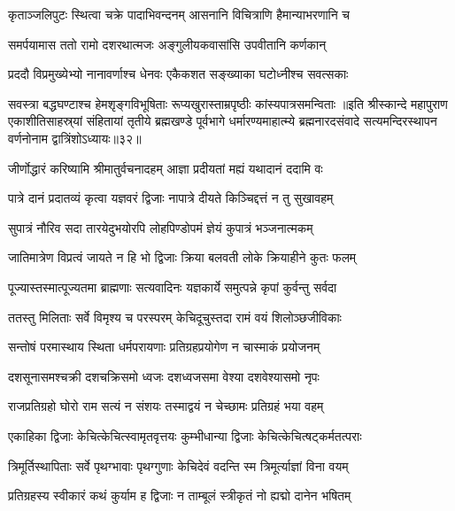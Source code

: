 \twolineshloka
{कृताञ्जलिपुटः स्थित्वा चक्रे पादाभिवन्दनम्}
{आसनानि विचित्राणि हैमान्याभरणानि च}%

\twolineshloka
{समर्पयामास ततो रामो दशरथात्मजः}
{अङ्गुलीयकवासांसि उपवीतानि कर्णकान्}%

\twolineshloka
{प्रददौ विप्रमुख्येभ्यो नानावर्णाश्च धेनवः}
{एकैकशत सङ्ख्याका घटोध्नीश्च सवत्सकाः}%

\twolineshloka
{सवस्त्रा बद्धघण्टाश्च हेमशृङ्गविभूषिताः}
{रूप्यखुरास्ताम्रपृष्ठीः कांस्यपात्रसमन्विताः}%
॥इति श्रीस्कान्दे महापुराण एकाशीतिसाहस्र्यां संहितायां तृतीये ब्रह्मखण्डे पूर्वभागे धर्मारण्यमाहात्म्ये ब्रह्मनारदसंवादे सत्यमन्दिरस्थापन वर्णनोनाम द्वात्रिंशोऽध्यायः॥३२॥


\twolineshloka
{जीर्णोद्धारं करिष्यामि श्रीमातुर्वचनादहम्}
{आज्ञा प्रदीयतां मह्यं यथादानं ददामि वः}%

\twolineshloka
{पात्रे दानं प्रदातव्यं कृत्वा यज्ञवरं द्विजाः}
{नापात्रे दीयते किञ्चिद्दत्तं न तु सुखावहम्}%

\twolineshloka
{सुपात्रं नौरिव सदा तारयेदुभयोरपि}
{लोहपिण्डोपमं ज्ञेयं कुपात्रं भञ्जनात्मकम्}%

\twolineshloka
{जातिमात्रेण विप्रत्वं जायते न हि भो द्विजाः}
{क्रिया बलवती लोके क्रियाहीने कुतः फलम्}%

\twolineshloka
{पूज्यास्तस्मात्पूज्यतमा ब्राह्मणाः सत्यवादिनः}
{यज्ञकार्ये समुत्पन्ने कृपां कुर्वन्तु सर्वदा}%


\twolineshloka
{ततस्तु मिलिताः सर्वे विमृश्य च परस्परम्}
{केचिदूचुस्तदा रामं वयं शिलोञ्छजीविकाः}%

\twolineshloka
{सन्तोषं परमास्थाय स्थिता धर्मपरायणाः}
{प्रतिग्रहप्रयोगेण न चास्माकं प्रयोजनम्}%

\twolineshloka
{दशसूनासमश्चक्री दशचक्रिसमो ध्वजः}
{दशध्वजसमा वेश्या दशवेश्यासमो नृपः}%

\twolineshloka
{राजप्रतिग्रहो घोरो राम सत्यं न संशयः}
{तस्माद्वयं न चेच्छामः प्रतिग्रहं भया वहम्}%

\twolineshloka
{एकाहिका द्विजाः केचित्केचित्स्वामृतवृत्तयः}
{कुम्भीधान्या द्विजाः केचित्केचित्षट्कर्मतत्पराः}%

\twolineshloka
{त्रिमूर्तिस्थापिताः सर्वे पृथग्भावाः पृथग्गुणाः}
{केचिदेवं वदन्ति स्म त्रिमूर्त्याज्ञां विना वयम्}%

\twolineshloka
{प्रतिग्रहस्य स्वीकारं कथं कुर्याम ह द्विजाः}
{न ताम्बूलं स्त्रीकृतं नो ह्यद्मो दानेन भषितम्}%

